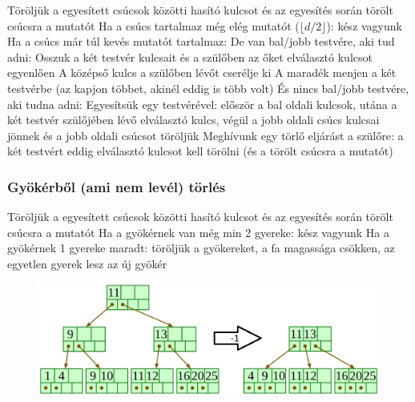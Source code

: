 \documentclass[12pt,a4paper]{article}
\begin{document}
\begin{outline}
	\1 Töröljük a egyesített csúcsok közötti hasító kulcsot és az egyesítés során törölt csúcsra a mutatót
	\1 Ha a csúcs tartalmaz még elég mutatót ($\lfloor d/2 \rfloor$): kész vagyunk
	\1 Ha a csúcs már túl kevés mutatót tartalmaz:
		\2 De van bal/jobb testvére, aki tud adni:
			\3 Osszuk a két testvér kulcsait és a szülőben az őket elválasztó kulcsot egyenlően
			\3 A középső kulcs a szülőben lévőt cserélje ki
			\3 A maradék menjen a két testvérbe (az kapjon többet, akinél eddig is több volt)
		\2 És nincs bal/jobb testvére, aki tudna adni:
			\3 Egyesítsük egy testvérével: először a bal oldali kulcsok, utána a két testvér szülőjében lévő elválasztó kulcs, végül a jobb oldali csúcs kulcsai jönnek
			és a jobb oldali csúcsot töröljük
			\3 Meghívunk egy törlő eljárást a szülőre: a két testvért eddig elválasztó kulcsot kell törölni (és a törölt csúcsra a mutatót)
\end{outline}

\subsubsection{Gyökérből (ami nem levél) törlés}

\begin{outline}
	\1 Töröljük a egyesített csúcsok közötti hasító kulcsot és az egyesítés során törölt csúcsra a mutatót
	\1 Ha a gyökérnek van még min 2 gyereke: kész vagyunk
	\1 Ha a gyökérnek 1 gyereke maradt: töröljük a gyökereket, a fa magassága csökken, az egyetlen gyerek lesz az új gyökér
\end{outline}

\begin{figure}[h!]
	\centering
	\includegraphics[width=0.8\linewidth]{b+ törlés belsőcsúcs}
\end{figure}
\end{document}
